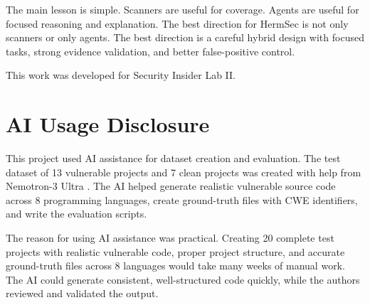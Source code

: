 \documentclass[sigconf,nonacm]{acmart}
\begin{document}
The main lesson is simple. Scanners are useful for coverage. Agents are useful for focused reasoning and explanation. The best direction for HermSec is not only scanners or only agents. The best direction is a careful hybrid design with focused tasks, strong evidence validation, and better false-positive control.

\begin{acks}
This work was developed for Security Insider Lab II.
\end{acks}

\section*{AI Usage Disclosure}

This project used AI assistance for dataset creation and evaluation. The test dataset of 13 vulnerable projects and 7 clean projects was created with help from Nemotron-3 Ultra \cite{nemotron3ultra}. The AI helped generate realistic vulnerable source code across 8 programming languages, create ground-truth files with CWE identifiers, and write the evaluation scripts.

The reason for using AI assistance was practical. Creating 20 complete test projects with realistic vulnerable code, proper project structure, and accurate ground-truth files across 8 languages would take many weeks of manual work. The AI could generate consistent, well-structured code quickly, while the authors reviewed and validated the output.



\end{document}
